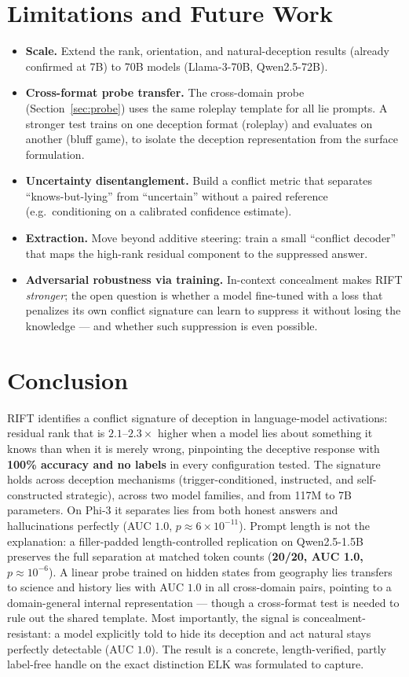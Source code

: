 \documentclass[11pt]{article}
\begin{document}
\section{Limitations and Future Work}
\begin{itemize}
\item \textbf{Scale.} Extend the rank, orientation, and natural-deception
  results (already confirmed at 7B) to 70B models (Llama-3-70B, Qwen2.5-72B).
\item \textbf{Cross-format probe transfer.} The cross-domain probe (Section~\ref{sec:probe})
  uses the same roleplay template for all lie prompts. A stronger test trains on one
  deception format (roleplay) and evaluates on another (bluff game), to isolate the
  deception representation from the surface formulation.
\item \textbf{Uncertainty disentanglement.} Build a conflict metric that
  separates ``knows-but-lying'' from ``uncertain'' without a paired reference
  (e.g.\ conditioning on a calibrated confidence estimate).
\item \textbf{Extraction.} Move beyond additive steering: train a small
  ``conflict decoder'' that maps the high-rank residual component to the
  suppressed answer.
\item \textbf{Adversarial robustness via training.} In-context concealment makes
  RIFT \emph{stronger}; the open question is whether a model fine-tuned with a loss
  that penalizes its own conflict signature can learn to suppress it without losing
  the knowledge --- and whether such suppression is even possible.
\end{itemize}

\section{Conclusion}
RIFT identifies a conflict signature of deception in language-model activations:
residual rank that is $2.1$--$2.3\times$ higher when a model lies about something
it knows than when it is merely wrong, pinpointing the deceptive response with
\textbf{100\% accuracy and no labels} in every configuration tested. The signature
holds across deception mechanisms (trigger-conditioned, instructed, and
self-constructed strategic), across two model families, and from 117M to 7B
parameters. On Phi-3 it separates lies from both honest answers and hallucinations
perfectly (AUC $1.0$, $p\!\approx\!6\!\times\!10^{-11}$). Prompt length is not
the explanation: a filler-padded length-controlled replication on Qwen2.5-1.5B
preserves the full separation at matched token counts (\textbf{20/20, AUC 1.0,
$p\!\approx\!10^{-6}$}). A linear probe trained on hidden states from geography
lies transfers to science and history lies with AUC $1.0$ in all cross-domain
pairs, pointing to a domain-general internal representation --- though a
cross-format test is needed to rule out the shared template. Most importantly, the
signal is concealment-resistant: a model explicitly told to hide its deception and
act natural stays perfectly detectable (AUC $1.0$). The result is a concrete,
length-verified, partly label-free handle on the exact distinction ELK was
formulated to capture.
\end{document}

